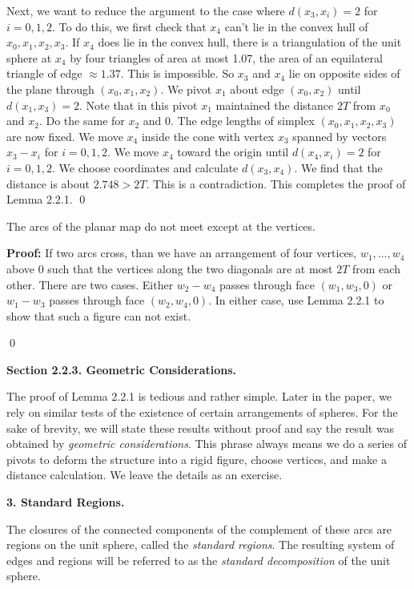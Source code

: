 Next, we want to reduce the argument to the case where 
$d(x_3,x_i)=2$ for $i=0,1,2$.  To do this, we first check that 
$x_4$ can't lie in the convex hull of $x_0,x_1,x_2,x_3$.  If $x_4$ does lie 
in the convex hull, there is a triangulation of the unit sphere at $x_4$ 
by four triangles of area at most 1.07, the area of an equilateral triangle 
of edge $\approx 1.37$.   This is impossible.  So $x_3$ and $x_4$ lie on opposite sides 
of the plane through $(x_0,x_1,x_2)$.  We pivot $x_1$ about edge $(x_0,x_2)$ until 
$d(x_1,x_3)=2$.  Note that in this pivot $x_1$ maintained the distance $2T$ 
from $x_0$ and $x_2$.  Do the same for $x_2$ and $0$.  The edge lengths of 
simplex $(x_0,x_1,x_2,x_3)$ are now fixed.  We move $x_4$ inside the cone 
with vertex $x_3$ spanned by vectors $x_3-x_i$ for $i=0,1,2$.  
We move $x_4$ toward the origin until $d(x_4,x_i)=2$ for $i=0,1,2$.  We choose coordinates
and calculate $d(x_3,x_4)$.  We find that the distance is about $2.748 > 2T$.
This is a contradiction.  This completes the proof of Lemma 2.2.1. \qed

 The arcs of the planar map do not meet except at the vertices.  \endproclaim

{\bf Proof:} If two arcs cross, than we have an arrangement of four vertices, 
$w_1,\dots,w_4$
 above $0$ such that the vertices along the two diagonals are at most $2T$ from each other.
There are two cases.  Either $w_2-w_4$ passes through face $(w_1,w_3,0)$ or $w_1-w_3$ 
passes through face $(w_2,w_4,0)$.  In either case, use Lemma 2.2.1 to show that such a figure 
can not exist.  

\qed


\bigskip

{\bf Section 2.2.3. Geometric Considerations.}

\bigskip
The proof of Lemma 2.2.1 is tedious and rather simple.  Later in the paper, we rely on similar tests of the existence of certain arrangements of spheres.  For the sake of brevity, we will state these results without proof and say the result was obtained by {\it geometric considerations}.  This phrase always means we do a series of pivots to deform the structure into a rigid figure, choose vertices, and make a distance calculation.  We leave the details as an exercise.


\bigskip

\centerline{ { \bf 3. Standard Regions.}}

\bigskip

The closures of the connected components of the complement of these arcs are regions 
on the unit sphere, called the {\it standard regions}. 
 The resulting system of edges and regions will be 
referred to as the {\it standard decomposition} of the unit sphere.



